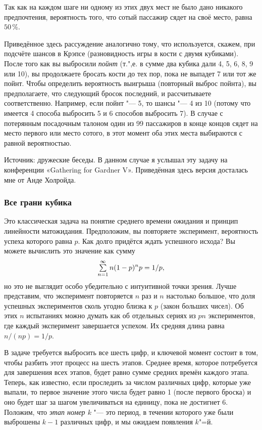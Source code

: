\documentclass[twoside]{book}
\begin{document}
Так как на каждом шаге ни одному из этих двух мест не было дано никакого предпочтения, вероятность того, что сотый пассажир сядет на своё место, равна $50\,\%$.
\heart

Приведённое здесь рассуждение аналогично тому, что используется, скажем, при подсчёте шансов в Крэпсе (разновидность игры в кости с двумя кубиками).
После того как вы выбросили \emph{пойнт}
(т.",е. в сумме два кубика дали 4, 5, 6, 8, 9 или 10), вы продолжаете бросать кости до тех пор, пока не выпадет 7 или тот же пойнт.
Чтобы определить вероятность выигрыша (повторный выброс пойнта), вы предполагаете, что следующий бросок последний, и рассчитываете соответственно.
Например, если пойнт "--- 5, то шансы "--- 4 из 10 (потому что имеется 4 способа выбросить 5 и 6 способов выбросить 7).
В случае с потерянным посадочным талоном один из 99 пассажиров в конце концов сядет на место первого или место сотого, в этот момент оба этих места выбираются с равной вероятностью. 

\medskip

{\small

Источник: дружеские беседы.
В данном случае я услышал эту задачу на конференции «Gathering for Gardner V».
Приведённая здесь версия досталась мне от Анде Холройда. %

}
\subsubsection*{Все грани кубика}%

Это классическая задача на понятие среднего времени ожидания и принцип линейности матожидания.
Предположим, вы повторяете эксперимент, вероятность успеха которого равна $p$.
Как долго придётся ждать успешного исхода? Вы можете вычислить это значение как сумму
\[\mathop{\textstyle\sum}\limits_{n=1}^\infty n(1-p)^np=1/p,\]
но это не выглядит особо убедительно с интуитивной точки зрения.
Лучше представим, что эксперимент повторяется $n$ раз и $n$ настолько большое, что доля успешных экспериментов сколь угодно близка к $p$ (закон больших чисел).
Об этих $n$ испытаниях можно думать как об отдельных сериях из $pn$ экспериментов, где каждый эксперимент завершается успехом.
Их средняя длина равна $n/(np)=1/p$.

В задаче требуется выбросить все шесть цифр, и ключевой момент состоит в том, чтобы разбить этот процесс на шесть этапов.
Среднее время, которое потребуется для завершения всех этапов, будет равно сумме средних времён каждого этапа.
Теперь, как известно, если проследить за числом различных цифр, которые уже выпали, то первое значение этого числа будет равно 1 (после первого броска) и оно будет шаг за шагом увеличиваться на единицу, пока не достигнет 6.
Положим, что \emph{этап номер $k$} "--- это период, в течении которого уже были выброшены $k-1$ различных цифр, и мы ожидаем появления $k$"=й.
\end{document}
